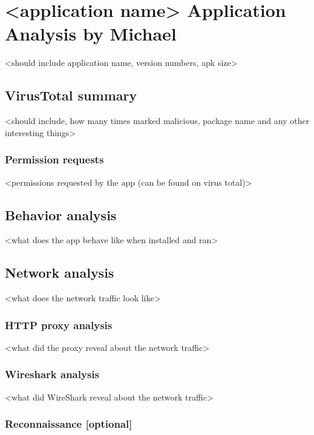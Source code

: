 \section{<application name> Application Analysis by Michael}

<should include application name, version numbers, apk size>

\newpage
\subsection{VirusTotal summary}

<should include, how many times marked malicious, package name and any other interesting things>

\subsubsection{Permission requests}

<permissions requested by the app (can be found on virus total)>

\newpage
\subsection{Behavior analysis}

<what does the app behave like when installed and ran>

\newpage
\subsection{Network analysis}

<what does the network traffic look like>

\subsubsection{HTTP proxy analysis}

<what did the proxy reveal about the network traffic>

\subsubsection{Wireshark analysis}

<what did WireShark reveal about the network traffic>

\subsubsection{Reconnaissance [optional]}

